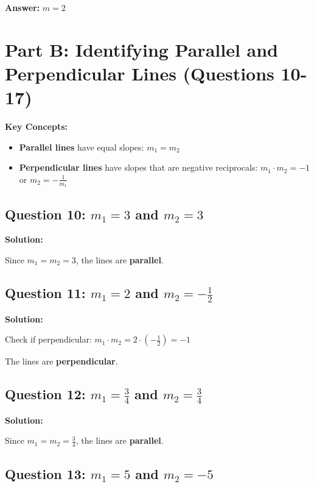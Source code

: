 \documentclass[12pt]{article}
\begin{document}
\textbf{Answer: } $m = 2$

\newpage

\section{Part B: Identifying Parallel and Perpendicular Lines (Questions 10-17)}

\textbf{Key Concepts:}
\begin{itemize}
\item \textbf{Parallel lines} have equal slopes: $m_1 = m_2$
\item \textbf{Perpendicular lines} have slopes that are negative reciprocals: $m_1 \cdot m_2 = -1$ or $m_2 = -\frac{1}{m_1}$
\end{itemize}

\subsection*{Question 10: $m_1 = 3$ and $m_2 = 3$}

\noindent\textbf{Solution:}

Since $m_1 = m_2 = 3$, the lines are \textbf{parallel}.

\vspace{0.3cm}

\subsection*{Question 11: $m_1 = 2$ and $m_2 = -\frac{1}{2}$}

\noindent\textbf{Solution:}

Check if perpendicular: $m_1 \cdot m_2 = 2 \cdot \left(-\frac{1}{2}\right) = -1$

The lines are \textbf{perpendicular}.

\vspace{0.3cm}

\subsection*{Question 12: $m_1 = \frac{3}{4}$ and $m_2 = \frac{3}{4}$}

\noindent\textbf{Solution:}

Since $m_1 = m_2 = \frac{3}{4}$, the lines are \textbf{parallel}.

\vspace{0.3cm}

\subsection*{Question 13: $m_1 = 5$ and $m_2 = -5$}
\end{document}
